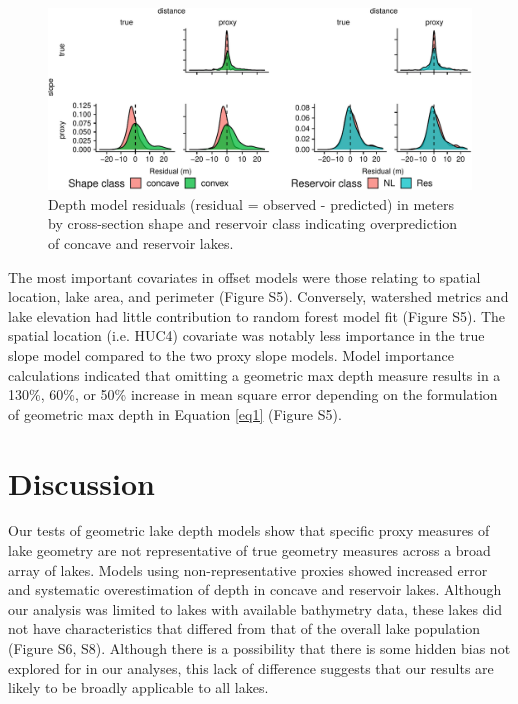 \documentclass[draft]{agujournal2019}
\begin{document}
\begin{figure}
  \begin{center}
    \includegraphics[width=\textwidth,keepaspectratio]{../figures/02_depth_model_grid_resid-1}
  \end{center}
  \caption{Depth model residuals (residual  = observed - predicted) in meters by cross-section shape and reservoir class indicating overprediction of concave and reservoir lakes.}\label{fig3}
\end{figure}

The most important covariates in offset models were those relating to spatial location, lake area, and perimeter (Figure S5). Conversely, watershed metrics and lake elevation had little contribution to random forest model fit (Figure S5). The spatial location (i.e. HUC4) covariate was notably less importance in the true slope model compared to the two proxy slope models. Model importance calculations indicated that omitting a geometric max depth measure results in a 130\%, 60\%, or 50\% increase in mean square error depending on the formulation of geometric max depth in Equation \ref{eq1} (Figure S5).

\section{Discussion}
\noindent
Our tests of geometric lake depth models show that specific proxy measures of lake geometry are not representative of true geometry measures across a broad array of lakes. Models using non-representative proxies showed increased error and systematic overestimation of depth in concave and reservoir lakes. Although our analysis was limited to lakes with available bathymetry data, these lakes did not have characteristics that differed from that of the overall lake population (Figure S6, S8). Although there is a possibility that there is some hidden bias not explored for in our analyses, this lack of difference suggests that our results are likely to be broadly applicable to all lakes.
\end{document}
